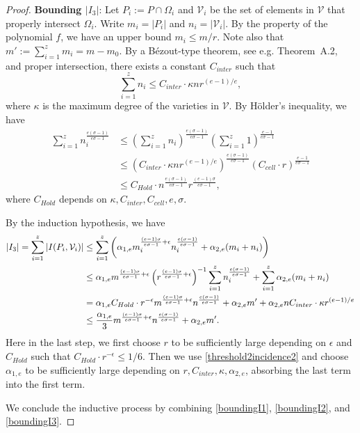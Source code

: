\documentclass[11pt]{article}
\theoremstyle{definition}
\begin{document}
\begin{proof}
\noindent \textbf{Bounding $|I_3|$}: Let $P_i := P\cap \Omega_i$ and $\mathcal{V}_i$ be the set of elements in $\mathcal{V}$ that properly intersect $\Omega_i$. Write $m_i = |P_i|$ and $n_i = |\mathcal{V}_i|$. By the property of the polynomial $f$, we have an upper bound $m_i \leq m/r$. Note also that $m' := \sum_{i=1}^z m_i = m-m_0$. By a B\'ezout-type theorem, see e.g. \cite{solymosi2012incidence} Theorem~A.2, and proper intersection, there exists a constant $C_{inter}$ such that \begin{equation*}
    \sum_{i=1}^z n_i \leq C_{inter} \cdot \kappa n r^{(e-1)/e},
\end{equation*} where $\kappa$ is the maximum degree of the varieties in $\mathcal{V}$. By H\"older's inequality, we have\begin{align*}
    \sum_{i=1}^z n_i^{\frac{e(\sigma-1)}{e\sigma-1}} &\leq \left( \sum_{i=1}^z n_i \right)^{\frac{e(\sigma-1)}{e\sigma-1}} \left( \sum_{i=1}^z 1 \right)^{\frac{e-1}{e\sigma-1}}\\
    &\leq \left( C_{inter}\cdot\kappa n r^{(e-1)/e} \right)^{\frac{e(\sigma-1)}{e\sigma-1}} \left( C_{cell} \cdot r \right)^{\frac{e-1}{e\sigma-1}}\\
    &\leq C_{Hold} \cdot n^{\frac{e(\sigma-1)}{e\sigma-1}} r^{\frac{(e-1)\sigma}{e\sigma-1}}, 
\end{align*} where $C_{Hold}$ depends on $\kappa,C_{inter},C_{cell},e,\sigma$.

By the induction hypothesis, we have \begin{align}
|I_3| = \sum_{i=1}^z |I(P_i,\mathcal{V}_i)| &\le \sum_{i=1}^z \left(\alpha_{1,e} m_i^{\frac{(e-1)\sigma}{e\sigma-1}+\epsilon}n_i^{\frac{e(\sigma-1)}{e\sigma-1}}+\alpha_{2,e}(m_i+n_i)\right) \notag\\
&\le \alpha_{1,e} m^{\frac{(e-1)\sigma}{e\sigma-1}+\epsilon}\left(r^{\frac{(e-1)\sigma}{e\sigma-1}+\epsilon}\right)^{-1} \sum_{i=1}^z n_i^{\frac{e(\sigma-1)}{e\sigma-1}} + \sum_{i=1}^z\alpha_{2,e}(m_i+n_i) \notag\\
&= \alpha_{1,e} C_{Hold}\cdot r^{-\epsilon}m^{\frac{(e-1)\sigma}{e\sigma-1}+\epsilon}n^{\frac{e(\sigma-1)}{e\sigma-1}} + \alpha_{2,e}m'+ \alpha_{2,e}n C_{inter}\cdot \kappa r^{(e-1)/e} \notag\\
&\leq \frac{\alpha_{1,e}}{3}m^{\frac{(e-1)\sigma}{e\sigma-1}+\epsilon}n^{\frac{e(\sigma-1)}{e\sigma-1}} + \alpha_{2,e}m'.\label{boundingI3}
\end{align} Here in the last step, we first choose $r$ to be sufficiently large depending on $\epsilon$ and $C_{Hold}$ such that $C_{Hold}\cdot r^{-\epsilon}\leq 1/6$. Then we use \eqref{threshold2incidence2} and choose $\alpha_{1,e}$ to be sufficiently large depending on $r, C_{inter},\kappa,\alpha_{2,e}$, absorbing the last term into the first term.

\medskip

We conclude the inductive process by combining \eqref{boundingI1}, \eqref{boundingI2}, and \eqref{boundingI3}.
\end{proof}
\end{document}

